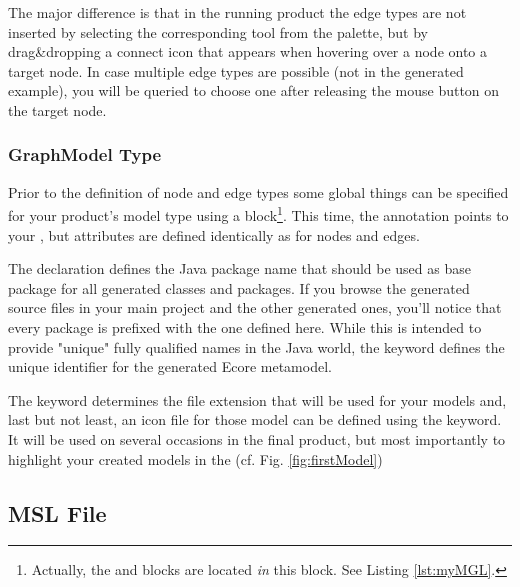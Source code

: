 \documentclass[a4paper,american,12pt]{scrreprt}
\begin{document}
The major difference is that in the running \cinco product the edge types are
not inserted by selecting the corresponding tool from the palette, but by
drag\&dropping a connect icon that appears when hovering over a node onto a
target node. In case multiple edge types are possible (not in the generated
example), you will be queried to choose one after releasing the mouse button on
the target node.

\subsubsection{GraphModel Type}

Prior to the definition of node and edge types some global things can be
specified for your \cinco product's model type using a 
 block\footnote{Actually, the  and  blocks are located
\emph{in} this  block. See Listing \ref{lst:myMGL}.}.
This time, the  annotation points to your ,
but attributes are defined identically as for nodes and edges.

The  declaration defines the Java package name that should be used
as base package for all generated classes and packages. If you browse the
generated source files in your main project and the other generated ones, you'll
notice that every package is prefixed with the one defined here. While this is
intended to provide "unique" fully qualified names in the Java world, the
 keyword defines the unique identifier for the generated Ecore
metamodel.

The  keyword determines the file extension that will be
used for your models and, last but not least, an icon file for those model can
be defined using the  keyword. It will be used on several occasions
in the final product, but most importantly to highlight your created models in
the  (cf. Fig. \ref{fig:firstModel}) 


\subsection{MSL File} \label{sec:msl}



\end{document}
